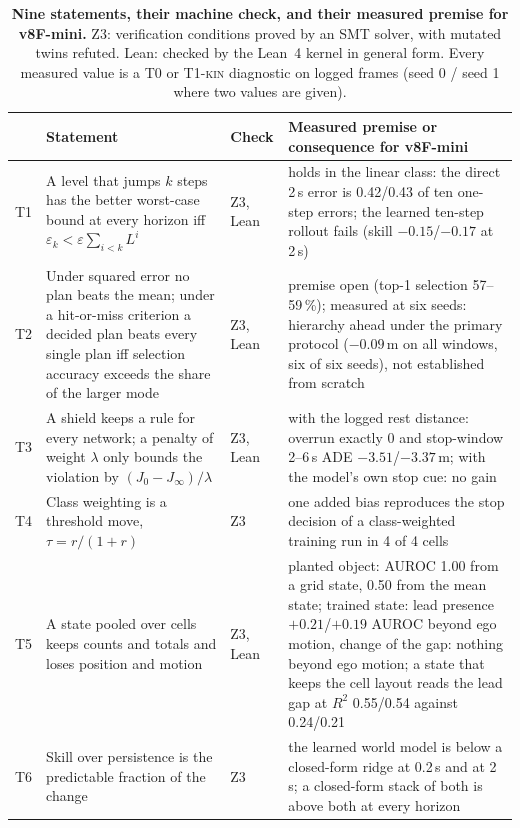 \documentclass[10pt,twocolumn]{article}
\theoremstyle{remark}
\newcommand{\tier}[1]{\textsc{\small #1}}
\begin{document}
\begin{table}[!tp]
\centering
\caption{\textbf{Nine statements, their machine check, and their measured premise for v8F-mini.} Z3: verification conditions proved by
an SMT solver, with mutated twins refuted. Lean: checked by the Lean~4 kernel in general form. Every measured value is a \tier{T0} or
\tier{T1-kin} diagnostic on logged frames (seed 0 / seed 1 where two values are given).}
\label{tab:theory}
\small
\begin{tabularx}{\textwidth}{@{}l>{\raggedright\arraybackslash}p{60mm}l>{\raggedright\arraybackslash}X@{}}
\toprule
 & Statement & Check & Measured premise or consequence for v8F-mini \\
\midrule
T1 & A level that jumps $k$ steps has the better worst-case bound at every horizon iff $\varepsilon_k<\varepsilon\sum_{i<k}L^i$ & Z3, Lean &
holds in the linear class: the direct 2\,s error is 0.42/0.43 of ten one-step errors; the learned ten-step rollout fails (skill $-0.15$/$-0.17$ at 2\,s) \\
T2 & Under squared error no plan beats the mean; under a hit-or-miss criterion a decided plan beats every single plan iff selection accuracy exceeds the share of the larger mode & Z3, Lean &
premise open (top-1 selection 57--59\,\%); measured at six seeds: hierarchy ahead under the primary protocol ($-0.09$\,m on all windows, six of six seeds), not established from scratch \\
T3 & A shield keeps a rule for every network; a penalty of weight $\lambda$ only bounds the violation by $(J_0-J_\infty)/\lambda$ & Z3, Lean &
with the logged rest distance: overrun exactly 0 and stop-window 2--6\,s ADE $-3.51$/$-3.37$\,m; with the model's own stop cue: no gain \\
T4 & Class weighting is a threshold move, $\tau=r/(1+r)$ & Z3 &
one added bias reproduces the stop decision of a class-weighted training run in 4 of 4 cells \\
T5 & A state pooled over cells keeps counts and totals and loses position and motion & Z3, Lean &
planted object: AUROC 1.00 from a grid state, 0.50 from the mean state; trained state: lead presence $+0.21$/$+0.19$ AUROC beyond ego motion, change of the gap: nothing beyond ego motion; a state that keeps the cell layout reads the lead gap at $R^2$ 0.55/0.54 against 0.24/0.21 \\
T6 & Skill over persistence is the predictable fraction of the change & Z3 &
the learned world model is below a closed-form ridge at 0.2\,s and at 2\,s; a closed-form stack of both is above both at every horizon \\

\end{tabularx}
\end{table}
\end{document}
